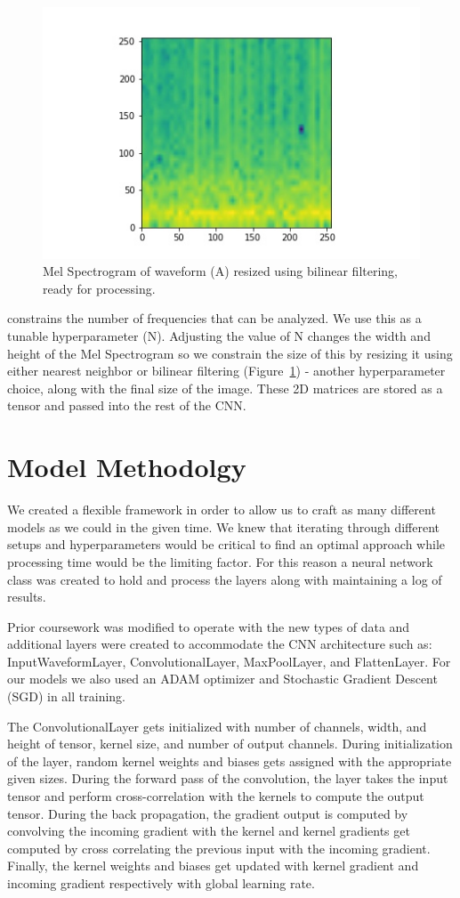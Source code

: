 \documentclass[conference]{IEEEtran}
\begin{document}
\begin{figure}[htbp]
\centerline{\includegraphics[width=.5\textwidth]{images/data/spectrogram_resize_153.jpg}}
\caption{Mel Spectrogram of waveform (A) resized using bilinear filtering, ready for processing.}
\label{melspec_resize}
\end{figure}

constrains the number of frequencies that can be analyzed. We use this as a tunable
hyperparameter (N). Adjusting the value of N changes the width and height of the Mel
Spectrogram so we constrain the size of this by resizing it using either nearest
neighbor or bilinear filtering (Figure~\ref{melspec_resize}) - another hyperparameter choice, along with the
final size of the image. These 2D matrices are stored as a tensor and passed into
the rest of the CNN.

\section{Model Methodolgy}

We created a flexible framework in order to allow us to craft as many different models as we could in the given time. We knew that iterating through different setups and hyperparameters would be critical to find an optimal approach while processing time would be the limiting factor. For this reason a neural network class was created to hold and process the layers along with maintaining a log of results.

Prior coursework was modified to operate with the new types of data and additional layers were created to accommodate the CNN architecture such as: InputWaveformLayer, ConvolutionalLayer, MaxPoolLayer, and FlattenLayer. For our models we also used an ADAM optimizer and Stochastic Gradient Descent (SGD) in all training.

The ConvolutionalLayer gets initialized with number of channels, width, and height of tensor, kernel size, and number of output channels. During initialization of the layer, random kernel weights and biases gets assigned with the appropriate given sizes. During the forward pass of the convolution, the layer takes the input tensor and perform cross-correlation with the kernels to compute the output tensor. During the back propagation, the gradient output is computed by convolving the incoming gradient with the kernel and kernel gradients get computed by cross correlating the previous input with the incoming gradient. Finally, the kernel weights and biases get updated with kernel gradient and incoming gradient respectively with global learning rate. 
\end{document}

